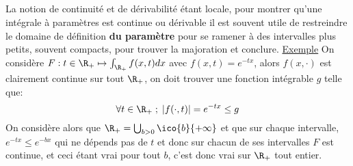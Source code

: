 \subsection*{}
La notion de continuité et de dérivabilité étant locale, pour montrer qu'une intégrale à paramètres est continue ou dérivable il est souvent utile de restreindre le domaine de définition \textbf{du paramètre} pour se ramener à des intervalles plus petits, souvent compacts, pour trouver la majoration et conclure.\<
\uline{Exemple} On considère \(F : t \in \R_+ \mapsto \int_{\R_+} f(x, t)dx\) avec \(f(x, t) = e^{-tx}\), alors \(f(x, \cdot)\) est clairement continue sur tout \(\R_+\), on doit trouver une fonction intégrable \(g\) telle que:
\[
   \forall t \in \R_+ \; ; \; |f(\cdot, t)| = e^{-tx} \leq g
\]
On considère alors que \(\R_+ = \bigcup_{b > 0} \ico{b}{+\infty}\) et que sur chaque intervalle, \(e^{-tx} \leq e^{-bx}\) qui ne dépends pas de \(t\) et donc sur chacun de ses intervalles \(F\) est continue, et ceci étant vrai pour tout \(b\), c'est donc vrai sur \(\R_+\) tout entier.


